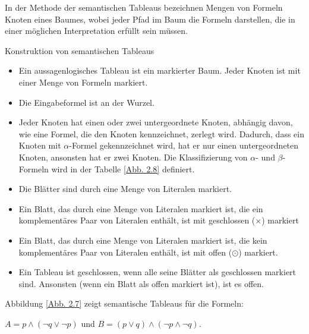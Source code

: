  

In der Methode der semantischen Tableaus bezeichnen Mengen von Formeln Knoten eines Baumes, wobei jeder Pfad im Baum die Formeln darstellen, die in einer möglichen Interpretation erfüllt sein müssen.

\begin{defi} \label{Def.Tableau} Konstruktion von semantischen Tableaus\end{defi} 
\begin{itemize}
\item Ein aussagenlogisches Tableau ist ein markierter Baum. Jeder Knoten ist mit einer Menge von Formeln markiert.
\item Die Eingabeformel ist an der Wurzel. 
\item Jeder Knoten hat einen oder zwei untergeordnete Knoten, abhängig davon, wie eine Formel, die den Knoten kennzeichnet, zerlegt wird. Dadurch, dass ein Knoten mit $\alpha$-Formel gekennzeichnet wird, hat er nur einen untergeordneten Knoten, ansonsten hat er zwei Knoten. Die Klassifizierung von $\alpha$- und $\beta$-Formeln wird in der Tabelle \ref{Abb. 2.8} definiert.
\item Die Blätter sind durch eine Menge von Literalen markiert.
\item Ein Blatt, das durch eine Menge von Literalen markiert ist, die ein komplementäres Paar von Literalen enthält, ist mit geschlossen ($\times$) markiert
\item Ein Blatt, das durch eine Menge von Literalen markiert ist, die kein komplementäres Paar von Literalen enthält, ist mit offen ($\odot$) markiert. 
\item Ein Tableau ist geschlossen, wenn alle seine Blätter als geschlossen markiert sind. Ansonsten (wenn ein Blatt als offen markiert ist), ist es offen.\cite{Ben-Ari}
\end{itemize}


Abbildung \ref{Abb. 2.7} zeigt semantische Tableaus für die Formeln:

$A = p\wedge (\neg q \vee \neg p)$ und $B = (p \vee q) \wedge  (\neg p \wedge  \neg q)$.

